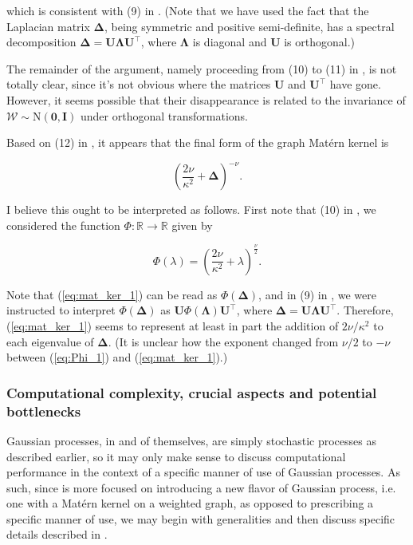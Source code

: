 which is consistent with (9) in \cite{pmlr-v130-borovitskiy21a}. (Note that we have used the fact that the Laplacian matrix $\bm \Delta$, being symmetric and positive semi-definite, has a spectral decomposition $\bm \Delta = \mathbf U \bm \Lambda \mathbf U^\intercal$, where $\bm \Lambda$ is diagonal and $\mathbf U$ is orthogonal.)

The remainder of the argument, namely proceeding from (10) to (11) in \cite{pmlr-v130-borovitskiy21a}, is not totally clear, since it's not obvious where the matrices $\mathbf U$ and $\mathbf U^\intercal$ have gone. However, it seems possible that their disappearance is related to the invariance of $\bm{\mathcal W} \sim \mathrm N(\mathbf 0, \mathbf I)$ under orthogonal transformations.

Based on (12) in \cite{pmlr-v130-borovitskiy21a}, it appears that the final form of the graph Mat\'{e}rn kernel is

\begin{equation}\label{eq:mat_ker_1}
    \left(\frac{2\nu}{\kappa^2} + \bm \Delta \right)^{-\nu}.
\end{equation}

I believe this ought to be interpreted as follows. First note that (10) in \cite{pmlr-v130-borovitskiy21a}, we considered the function $\Phi \colon \mathbb R \to \mathbb R$ given by

\begin{equation}\label{eq:Phi_1}
    \Phi(\lambda) = \left(\frac{2\nu}{\kappa^2} + \lambda\right)^{\frac{\nu}{2}}.
\end{equation}

Note that (\ref{eq:mat_ker_1}) can be read as $\Phi(\bm \Delta)$, and in (9) in \cite{pmlr-v130-borovitskiy21a}, we were instructed to interpret $\Phi(\bm \Delta)$ as $\mathbf U \Phi(\bm \Lambda) \mathbf U^\intercal$, where $\bm \Delta = \mathbf U \bm \Lambda \mathbf U^{\intercal}$. Therefore, (\ref{eq:mat_ker_1}) seems to represent at least in part the addition of $2\nu / \kappa^2$ to each eigenvalue of $\bm \Delta$. (It is unclear how the exponent changed from $\nu / 2$ to $- \nu$ between (\ref{eq:Phi_1}) and (\ref{eq:mat_ker_1}).)

\subsubsection{Computational complexity, crucial aspects and potential bottlenecks}

Gaussian processes, in and of themselves, are simply stochastic processes as described earlier, so it may only make sense to discuss computational performance in the context of a specific manner of use of Gaussian processes. As such, since \cite{pmlr-v130-borovitskiy21a} is more focused on introducing a new flavor of Gaussian process, i.e. one with a Mat\'{e}rn kernel on a weighted graph, as opposed to prescribing a specific manner of use, we may begin with generalities and then discuss specific details described in \cite{pmlr-v130-borovitskiy21a}.

